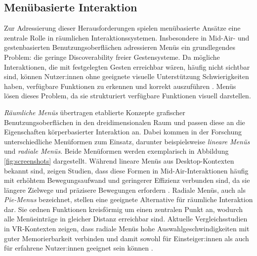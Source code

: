 
\subsection{Menübasierte Interaktion}
\label{sec:rw_menus}
Zur Adressierung dieser Herausforderungen spielen menübasierte Ansätze eine zentrale Rolle in räumlichen Interaktionssystemen. Insbesondere in Mid-Air- und gestenbasierten Benutzungsoberflächen adressieren Menüs ein grundlegendes Problem: die geringe Discoverability freier Gestensysteme. Da mögliche Interaktionen, die mit festgelegten Gesten erreichbar wären, häufig nicht sichtbar sind, können Nutzer:innen ohne geeignete visuelle Unterstützung Schwierigkeiten haben, verfügbare Funktionen zu erkennen und korrekt auszuführen \parencite{vogiatzidakis2018gestureeliticationstudiesreview, wobbrock2005discoverability}. Menüs lösen dieses Problem, da sie strukturiert verfügbare Funktionen visuell darstellen.

\textit{Räumliche Menüs} übertragen etablierte Konzepte grafischer Benutzungsoberflächen in den dreidimensionalen Raum und passen diese an die Eigenschaften körper\-basierter Interaktion an. Dabei kommen in der Forschung unterschiedliche Menüformen zum Einsatz, darunter beispielsweise \textit{lineare Menüs} und \textit{radiale Menüs}. Beide Menüformen werden exemplarisch in Abbildung \ref{fig:screenshots} dargestellt. Während lineare Menüs aus Desktop-Kontexten bekannt sind, zeigen Studien, dass diese Formen in Mid-Air-Interaktionen häufig mit erhöhtem Bewegungsaufwand und geringerer Effizienz verbunden sind, da sie längere Zielwege und präzisere Bewegungen erfordern \parencite{callahan1988comparisonPieVsLinearMenus}.
Radiale Menüs, auch als \textit{Pie-Menus} bezeichnet, stellen eine geeignete Alternative für räumliche Interaktion dar. Sie ordnen Funktionen kreisförmig um einen zentralen Punkt an, wodurch alle Menüeinträge in gleicher Distanz erreichbar sind. Aktuelle Vergleichsstudien in VR-Kontexten zeigen, dass radiale Menüs hohe Auswahlgeschwindigkeiten mit guter Memorierbarkeit verbinden und damit sowohl für Einsteiger:innen als auch für erfahrene Nutzer:innen geeignet sein können \parencite{wentzel2025camparisonofmenuarchetypesraycatingdirectinputmarkingmenus}.

